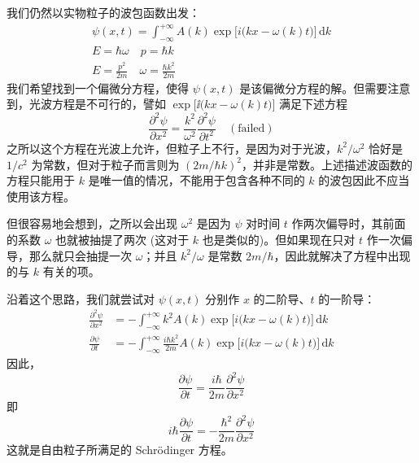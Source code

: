 我们仍然以实物粒子的波包函数出发：
\begin{gather}
  \psi(x, t) = \int_{- \infty}^{+ \infty} A(k) \exp \big[ i \big( k x - \omega(k) t \big) \big] \, \mathrm{d} k \\
  E = \hbar \omega \quad p = \hbar k \\
  E = \frac{p^2}{2 m} \quad \omega = \frac{\hbar k^2}{2 m}
\end{gather}
我们希望找到一个偏微分方程，使得 $\psi(x, t)$ 是该偏微分方程的解。但需要注意到，光波方程是不可行的，譬如 $\exp \big[ \ii \big( k x - \omega(k) t \big) \big]$ 满足下述方程
\begin{equation}
\frac{\partial^2 \psi}{\partial x^2} = \frac{k^2}{\omega^2} \frac{\partial^2 \psi}{\partial t^2} \quad \mathrm{(failed)}
\end{equation}
之所以这个方程在光波上允许，但粒子上不行，是因为对于光波，$k^2/\omega^2$ 恰好是 $1/c^2$ 为常数，但对于粒子而言则为 $(2m/\hbar k)^2$，并非是常数。上述描述波函数的方程只能用于 $k$ 是唯一值的情况，不能用于包含各种不同的 $k$ 的波包因此不应当使用该方程。

但很容易地会想到，之所以会出现 $\omega^2$ 是因为 $\psi$ 对时间 $t$ 作两次偏导时，其前面的系数 $\omega$ 也就被抽提了两次 (这对于 $k$ 也是类似的)。但如果现在只对 $t$ 作一次偏导，那么就只会抽提一次 $\omega$；并且 $k^2 / \omega$ 是常数 $2m/\hbar$，因此就解决了方程中出现的与 $k$ 有关的项。

沿着这个思路，我们就尝试对 $\psi(x, t)$ 分别作 $x$ 的二阶导、$t$ 的一阶导：
\begin{align}
  \frac{\partial^2 \psi}{\partial x^2} &= - \int_{- \infty}^{+ \infty} k^2 A(k) \exp \big[ i \big( k x - \omega(k) t \big) \big] \, \mathrm{d} k \\
  \frac{\partial \psi}{\partial t} &= - \int_{- \infty}^{+ \infty} \frac{i \hbar k^2}{2 m} A(k) \exp \big[ i \big( k x - \omega(k) t \big) \big] \, \mathrm{d} k
\end{align}
因此，
\begin{equation}
\frac{\partial \psi}{\partial t} = \frac{i \hbar}{2 m} \frac{\partial^2 \psi}{\partial x^2}
\end{equation}
即
\begin{equation}
i \hbar \frac{\partial \psi}{\partial t} = - \frac{\hbar^2}{2 m} \frac{\partial^2 \psi}{\partial x^2}
\end{equation}
这就是自由粒子所满足的 Schr\"odinger 方程。

